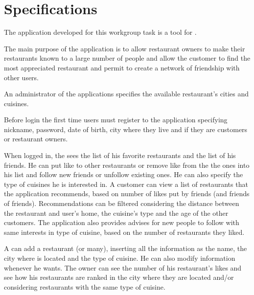 \chapter{Specifications}\label{ch:specs}

The application developed for this workgroup task is a tool for
.

The main purpose of the application is to allow restaurant
owners to make their restaurants known to a large number of people and allow the customer to find the most appreciated restaurant and permit to create a network of friendship with other users.

An administrator of the applications specifies the available restaurant's cities and cuisines.

Before login the first time users must register to the application specifying nickname, password, date of birth, city where they live and if they are customers or restaurant owners. 

When logged in, the  sees the list of his favorite restaurants and the list of his friends. He can put like to other restaurants or remove like from the the ones into his list and follow new friends or unfollow existing ones. He can also specify the type of cuisines he is interested in.
A customer can view a list of restaurants that the application recommends, based on number of likes put by friends (and friends of friends). Recommendations can be filtered considering the distance between the restaurant and user's home, the cuisine's type and the age of the other customers.
The application also provides advises for new people to follow with same interests in type of cuisine, based on the number of restaurants they liked.

A  can add a restaurant (or many), inserting all the information as the name, the city where is located and the type of cuisine. He can also modify information whenever he wants.
The owner can see the number of his restaurant's likes and see how his restaurants are ranked in the city where they are located and/or considering restaurants with the same type of cuisine.